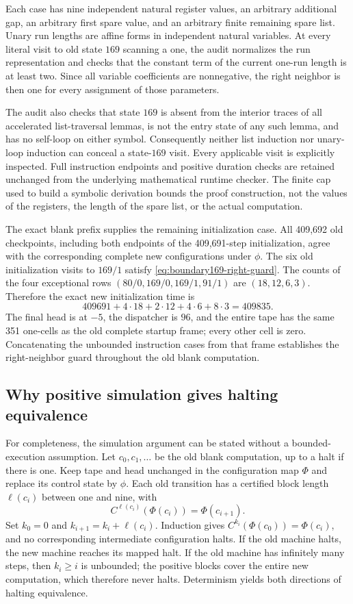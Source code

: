 Each case has nine independent natural register values, an arbitrary
additional gap, an arbitrary first spare value, and an arbitrary finite
remaining spare list.  Unary run lengths are affine forms in independent
natural variables.  At every literal visit to old state $169$ scanning a
one, the audit normalizes the run representation and checks that the
constant term of the current one-run length is at least two.  Since all
variable coefficients are nonnegative, the right neighbor is then one
for every assignment of those parameters.

The audit also checks that state $169$ is absent from the interior traces
of all accelerated list-traversal lemmas, is not the entry state of any
such lemma, and has no self-loop on either symbol.  Consequently neither
list induction nor unary-loop induction can conceal a state-$169$ visit.
Every applicable visit is explicitly inspected.  Full instruction
endpoints and positive duration checks are retained unchanged from the
underlying mathematical runtime checker.  The finite cap used to build
a symbolic derivation bounds the proof construction, not the values of
the registers, the length of the spare list, or the actual computation.

The exact blank prefix supplies the remaining initialization case.
All 409,692 old checkpoints, including both endpoints of the 409,691-step
initialization, agree with the corresponding complete new configurations
under $\phi$.  The six old initialization visits to $169/1$ satisfy
\eqref{eq:boundary169-right-guard}.  The counts of the four exceptional
rows $(80/0,169/0,169/1,91/1)$ are $(18,12,6,3)$.  Therefore the exact new
initialization time is
\[
409691+4\cdot18+2\cdot12+4\cdot6+8\cdot3=409835.
\]
The final head is at $-5$, the dispatcher is $96$, and the entire tape
has the same 351 one-cells as the old complete startup frame; every other
cell is zero.  Concatenating the unbounded instruction cases from that
frame establishes the right-neighbor guard throughout the old blank
computation.

\subsection{Why positive simulation gives halting equivalence}

For completeness, the simulation argument can be stated without a
bounded-execution assumption.  Let $c_0,c_1,\ldots$ be the old blank
computation, up to a halt if there is one.  Keep tape and head unchanged
in the configuration map $\Phi$ and replace its control state by $\phi$.
Each old transition has a certified block length $\ell(c_i)$ between
one and nine, with
\[
 C^{\ell(c_i)}(\Phi(c_i))=\Phi(c_{i+1}).
\]
Set $k_0=0$ and $k_{i+1}=k_i+\ell(c_i)$.  Induction gives
$C^{k_i}(\Phi(c_0))=\Phi(c_i)$, and no corresponding intermediate
configuration halts.  If the old machine halts, the new machine reaches
its mapped halt.  If the old machine has infinitely many steps, then
$k_i\ge i$ is unbounded; the positive blocks cover the entire new
computation, which therefore never halts.  Determinism yields both
directions of halting equivalence.

